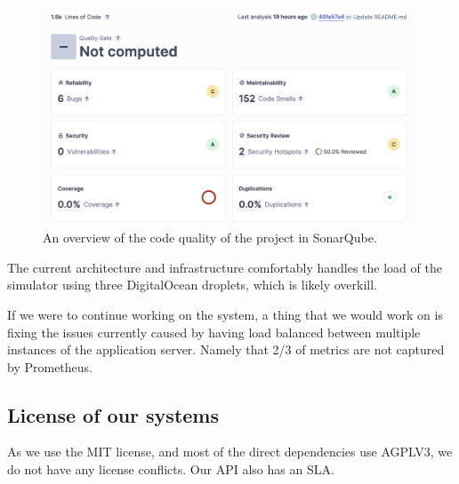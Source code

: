 \begin{figure}[H]
    \centering
    \includegraphics[width=\textwidth]{images/sonarStats.png}
    \caption{An overview of the code quality of the project in SonarQube.}
    \label{fig:sonarQubeOverview}
\end{figure}


The current architecture and infrastructure comfortably handles the load of the simulator using three DigitalOcean droplets, which is likely overkill.

If we were to continue working on the system, a thing that we would work on is fixing the issues currently caused by having load balanced between multiple instances of the application server. Namely that 2/3 of metrics are not captured by Prometheus.

\subsection{License of our systems}
As we use the MIT license, and most of the direct dependencies use AGPLV3, we do not have any license conflicts. Our API also has an SLA.